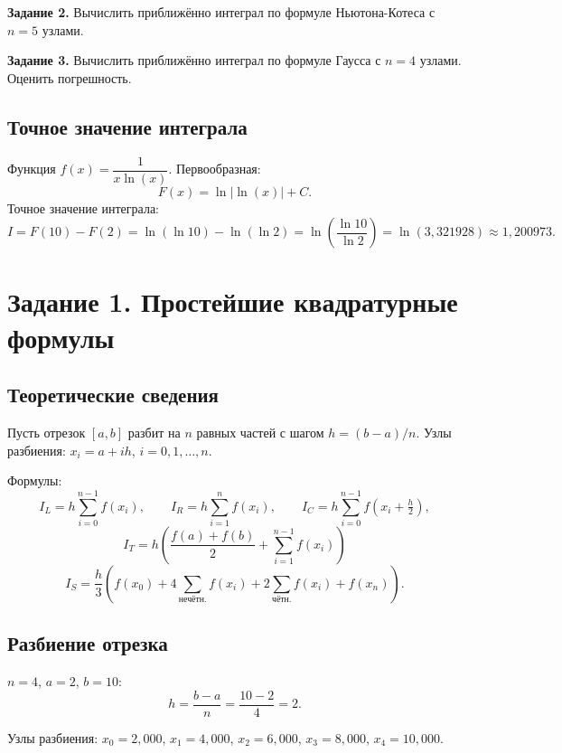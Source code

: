 \documentclass[a4paper, final]{article}
\begin{document}
\textbf{Задание 2.} Вычислить приближённо интеграл по формуле Ньютона-Котеса
с $n = 5$ узлами.

\textbf{Задание 3.} Вычислить приближённо интеграл по формуле Гаусса с $n = 4$
узлами. Оценить погрешность.

\subsection*{Точное значение интеграла}

Функция $f(x) = \dfrac{1}{x\ln(x)}$. Первообразная:
\[
F(x) = \ln|\ln(x)| + C.
\]
Точное значение интеграла:
\[
I = F(10) - F(2) = \ln(\ln 10) - \ln(\ln 2) = \ln\left(\frac{\ln 10}{\ln 2}\right)
  = \ln(3{,}321928) \approx 1{,}200973.
\]

\newpage

\section{Задание 1. Простейшие квадратурные формулы}

\subsection{Теоретические сведения}

Пусть отрезок $[a,b]$ разбит на $n$ равных частей с шагом $h = (b-a)/n$.
Узлы разбиения: $x_i = a + ih$, $i = 0, 1, \ldots, n$.

Формулы:
\[
I_L = h\sum_{i=0}^{n-1}f(x_i), \qquad
I_R = h\sum_{i=1}^{n}f(x_i), \qquad
I_C = h\sum_{i=0}^{n-1}f\!\left(x_i + \tfrac{h}{2}\right),
\]
\[
I_T = h\!\left(\frac{f(a)+f(b)}{2} + \sum_{i=1}^{n-1}f(x_i)\right)
\]
\[
I_S = \frac{h}{3}\!\left(f(x_0) + 4\!\sum_{\text{нечётн.}}\!f(x_i)
      + 2\!\sum_{\text{чётн.}}\!f(x_i) + f(x_n)\right).
\]

\subsection{Разбиение отрезка}

$n = 4$, $a = 2$, $b = 10$:
\[
h = \frac{b-a}{n} = \frac{10-2}{4} = 2.
\]

Узлы разбиения: $x_0 = 2{,}000$, $x_1 = 4{,}000$, $x_2 = 6{,}000$,
$x_3 = 8{,}000$, $x_4 = 10{,}000$.
\end{document}
